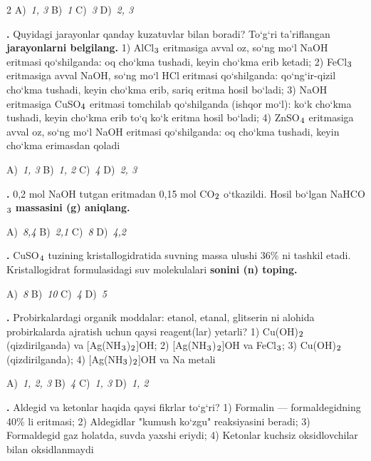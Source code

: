 \documentclass[11pt,a4paper]{article}
\renewcommand{\textsubscript}[1]{\ensuremath{_{\text{\fontsize{8}{8}\selectfont #1}}}}
\newcommand{\qn}[1]{\textbf{\fontsize{11.5}{13}\selectfont #1}}
\newcommand{\qsep}{\par\vspace{13pt}}
\begin{document}
\begin{multicols}{2}
\noindent A)~\textsl{1, 3} \hfill B)~\textsl{1} \hfill C)~\textsl{3} \hfill D)~\textsl{2, 3}\par
\qsep
\noindent\qn{17.} Quyidagi jarayonlar qanday kuzatuvlar bilan boradi? To`g`ri ta'riflangan \textbf{jarayonlarni belgilang.} 1) AlCl\textsubscript{3} eritmasiga avval oz, so`ng mo`l NaOH eritmasi qo`shilganda: oq cho`kma tushadi, keyin cho`kma erib ketadi; 2) FeCl\textsubscript{3} eritmasiga avval NaOH, so`ng mo`l HCl eritmasi qo`shilganda: qo`ng`ir-qizil cho`kma tushadi, keyin cho`kma erib, sariq eritma hosil bo`ladi; 3) NaOH eritmasiga CuSO\textsubscript{4} eritmasi tomchilab qo`shilganda (ishqor mo`l): ko`k cho`kma tushadi, keyin cho`kma erib to`q ko`k eritma hosil bo`ladi; 4) ZnSO\textsubscript{4} eritmasiga avval oz, so`ng mo`l NaOH eritmasi qo`shilganda: oq cho`kma tushadi, keyin cho`kma erimasdan qoladi

\noindent A)~\textsl{1, 3} \hfill B)~\textsl{1, 2} \hfill C)~\textsl{4} \hfill D)~\textsl{2, 3}\par
\qsep
\noindent\qn{18.} 0,2 mol NaOH tutgan eritmadan 0,15 mol CO\textsubscript{2} o`tkazildi. Hosil bo`lgan NaHCO\textsubscript{3} \textbf{massasini (g) aniqlang.}

\noindent A)~\textsl{8,4} \hfill B)~\textsl{2,1} \hfill C)~\textsl{8} \hfill D)~\textsl{4,2}\par
\qsep
\noindent\qn{19.} CuSO\textsubscript{4} tuzining kristallogidratida suvning massa ulushi 36\% ni tashkil etadi. Kristallogidrat formulasidagi suv molekulalari \textbf{sonini (n) toping.}

\noindent A)~\textsl{8} \hfill B)~\textsl{10} \hfill C)~\textsl{4} \hfill D)~\textsl{5}\par
\qsep
\noindent\qn{20.} Probirkalardagi organik moddalar: etanol, etanal, glitserin ni alohida probirkalarda ajratish uchun qaysi reagent(lar) yetarli? 1) Cu(OH)\textsubscript{2} (qizdirilganda) va [Ag(NH\textsubscript{3})\textsubscript{2}]OH; 2) [Ag(NH\textsubscript{3})\textsubscript{2}]OH va FeCl\textsubscript{3}; 3) Cu(OH)\textsubscript{2} (qizdirilganda); 4) [Ag(NH\textsubscript{3})\textsubscript{2}]OH va Na metali

\noindent A)~\textsl{1, 2, 3} \hfill B)~\textsl{4} \hfill C)~\textsl{1, 3} \hfill D)~\textsl{1, 2}\par
\qsep
\noindent\qn{21.} Aldegid va ketonlar haqida qaysi fikrlar to`g`ri? 1) Formalin --- formaldegidning 40\% li eritmasi; 2) Aldegidlar "kumush ko`zgu" reaksiyasini beradi; 3) Formaldegid gaz holatda, suvda yaxshi eriydi; 4) Ketonlar kuchsiz oksidlovchilar bilan oksidlanmaydi


\end{multicols}
\end{document}
